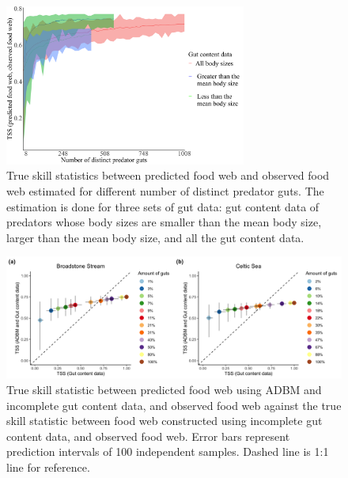 \documentclass{article}
\begin{document}
\begin{figure}

{\centering \includegraphics[width=300px]{../fig/TSS_with_n_pred_prop} 

}

\caption{\label{fig:fig_r3} True skill statistics between predicted food web and observed food web estimated for different number of distinct predator guts. The estimation is done for three sets of gut data: gut content data of predators whose body sizes are smaller than the mean body size, larger than the mean body size, and all the gut content data.}\label{fig:fig_r3}
\end{figure}

\begin{figure}

{\centering \includegraphics[width=500px]{../../results/misc/TSS_model_vs_data} 

}

\caption{\label{fig:fig_r31} True skill statistic between predicted food web using ADBM and incomplete gut content data, and observed food web against the true skill statistic between food web constructed using incomplete gut content data, and observed food web. Error bars represent prediction intervals of 100 independent samples. Dashed line is 1:1 line for reference.}\label{fig:fig_r31}
\end{figure}
\end{document}
